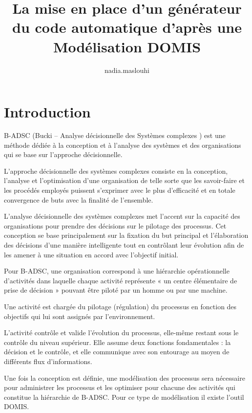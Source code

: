 


\title{La mise en place d'un générateur du code automatique d’après une Modélisation DOMIS}

\author{nadia.maslouhi }


\section{Introduction}

\vspace{1cm}
B-ADSC (Bucki – Analyse décisionnelle des Systèmes complexes )  est une méthode dédiée à la conception et à l’analyse des systèmes et des organisations qui se base sur l’approche décisionnelle.

L'approche décisionnelle des systèmes complexes consiste en la conception, l'analyse et l'optimisation d'une organisation de telle sorte que les savoir-faire et les procédés employés puissent s’exprimer avec le plus d'efficacité et en totale convergence de buts avec la finalité de l'ensemble.

\vspace{0,5cm}

L'analyse décisionnelle des systèmes complexes met l'accent sur la capacité des organisations pour prendre des décisions sur le pilotage des processus. 
Cet conception se base principalement sur la fixation du but principal et l’élaboration des décisions d’une manière intelligente tout en contrôlant leur évolution afin de les amener à une situation en accord avec l’objectif initial.

\vspace{0,5cm}

Pour B-ADSC, une organisation correspond à une hiérarchie opérationnelle d’activités dans laquelle chaque activité représente « un centre élémentaire de prise de décision » pouvant être piloté par un homme ou par une machine.

Une activité est chargée du pilotage (régulation) du processus en fonction des objectifs qui lui sont assignés par l'environnement.

L'activité contrôle et valide l'évolution du processus, elle-même restant sous le contrôle du niveau supérieur.  Elle assume deux fonctions fondamentales : la décision et le contrôle, et elle communique avec son entourage au moyen de différents flux d’informations.

\vspace{0,5cm}

Une fois la conception est définie, une modélisation des processus sera nécessaire pour administrer les processus et les optimiser pour chacune des activités qui constitue la hiérarchie de B-ADSC.
Pour ce type de modélisation il existe l’outil DOMIS.

